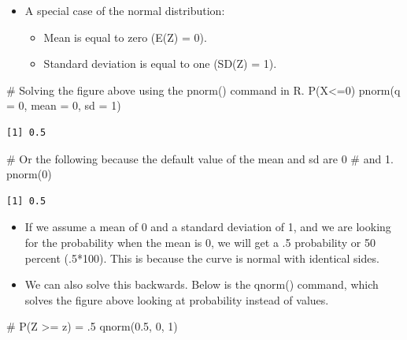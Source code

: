 \documentclass[
  letterpaper,
  DIV=11,
  numbers=noendperiod]{scrreprt}
\newenvironment{Shaded}{\begin{snugshade}}{\end{snugshade}}
\newcommand{\AttributeTok}[1]{\textcolor[rgb]{0.40,0.45,0.13}{#1}}
\newcommand{\CommentTok}[1]{\textcolor[rgb]{0.37,0.37,0.37}{#1}}
\newcommand{\DecValTok}[1]{\textcolor[rgb]{0.68,0.00,0.00}{#1}}
\newcommand{\FloatTok}[1]{\textcolor[rgb]{0.68,0.00,0.00}{#1}}
\newcommand{\FunctionTok}[1]{\textcolor[rgb]{0.28,0.35,0.67}{#1}}
\newcommand{\NormalTok}[1]{\textcolor[rgb]{0.00,0.23,0.31}{#1}}
\providecommand{\tightlist}{%
  \setlength{\itemsep}{0pt}\setlength{\parskip}{0pt}}\usepackage{longtable,booktabs,array}
\begin{document}
\begin{itemize}
\tightlist
\item
  A special case of the normal distribution:

  \begin{itemize}
  \tightlist
  \item
    Mean is equal to zero (E(Z) = 0).
  \item
    Standard deviation is equal to one (SD(Z) = 1).
  \end{itemize}
\end{itemize}

\begin{Shaded}
\begin{Highlighting}[]
\CommentTok{\# Solving the figure above using the pnorm() command in R.  P(X\textless{}=0)}
\FunctionTok{pnorm}\NormalTok{(}\AttributeTok{q =} \DecValTok{0}\NormalTok{, }\AttributeTok{mean =} \DecValTok{0}\NormalTok{, }\AttributeTok{sd =} \DecValTok{1}\NormalTok{)}
\end{Highlighting}
\end{Shaded}

\begin{verbatim}
[1] 0.5
\end{verbatim}

\begin{Shaded}
\begin{Highlighting}[]
\CommentTok{\# Or the following because the default value of the mean and sd are 0}
\CommentTok{\# and 1.}
\FunctionTok{pnorm}\NormalTok{(}\DecValTok{0}\NormalTok{)}
\end{Highlighting}
\end{Shaded}

\begin{verbatim}
[1] 0.5
\end{verbatim}

\begin{itemize}
\item
  If we assume a mean of 0 and a standard deviation of 1, and we are
  looking for the probability when the mean is 0, we will get a .5
  probability or 50 percent (.5*100). This is because the curve is
  normal with identical sides.
\item
  We can also solve this backwards. Below is the qnorm() command, which
  solves the figure above looking at probability instead of values.
\end{itemize}

\begin{Shaded}
\begin{Highlighting}[]
\CommentTok{\# P(Z \textgreater{}= z) = .5}
\FunctionTok{qnorm}\NormalTok{(}\FloatTok{0.5}\NormalTok{, }\DecValTok{0}\NormalTok{, }\DecValTok{1}\NormalTok{)}
\end{Highlighting}
\end{Shaded}
\end{document}
